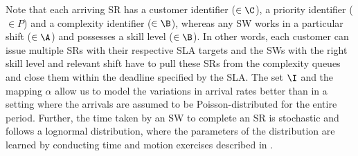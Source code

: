 \documentclass[11pt,letterpaper,english]{article}
\begin{document}
Note that each arriving SR has a customer identifier ($\in \C$), a
priority identifier ($\in P$) and a complexity identifier ($\in \B$), whereas
any SW works in a particular shift
($\in \A$) and possesses a skill level ($\in \B$). In other words, each customer
can issue multiple SRs with their respective SLA targets and the SWs with the
right skill level and relevant shift have to pull these SRs from the complexity
queues and close them within the deadline specified by the SLA. The set $\I$ and
the mapping $\alpha$ allow us to model the variations in arrival rates better
than in a setting where the arrivals are assumed to be Poisson-distributed for
the entire period. 
Further, the time taken by an SW to complete an SR is stochastic and follows a
lognormal distribution, where the parameters of the distribution are
learned by conducting time and motion exercises described in
\citep{banerjee2011simulation}.
\end{document}
